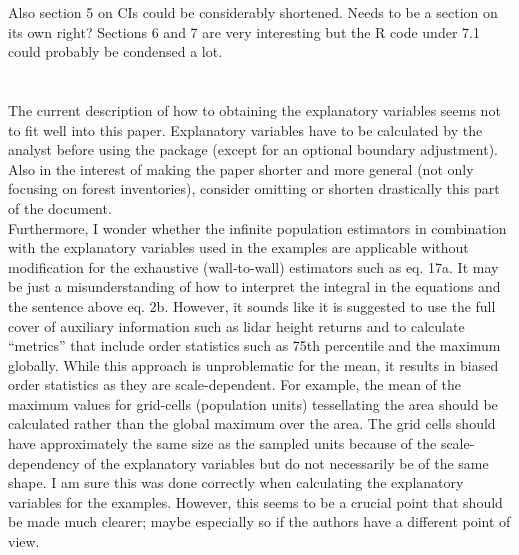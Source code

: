 \documentclass{article}
\begin{document}
Also section 5 on CIs could be considerably shortened. Needs to be a section on its own right? Sections 6 and 7 are very interesting but the R code under 7.1 could probably be condensed a lot.\\
\\
 \\

The current description of how to obtaining the explanatory variables seems not to fit well into this paper. Explanatory variables have to be calculated by the analyst before using the package (except for an optional boundary adjustment). Also in the interest of making the paper shorter and more general (not only focusing on forest inventories), consider omitting or shorten drastically this part of the document.\\

Furthermore, I wonder whether the infinite population estimators in combination with the explanatory variables used in the examples are applicable without modification for the exhaustive (wall-to-wall) estimators such as eq. 17a. It may be just a misunderstanding of how to interpret the integral in the equations and the sentence above eq. 2b. However, it sounds like it is suggested to use the full cover of auxiliary information such as lidar height returns and to calculate “metrics” that include order statistics such as 75th percentile and the maximum globally. While this approach is unproblematic for the mean, it results in biased order statistics as they are scale-dependent. For example, the mean of the maximum values for grid-cells (population units) tessellating the area should be calculated rather than the global maximum over the area. The grid cells should have approximately the same size as the sampled units because of the scale-dependency of the explanatory variables but do not necessarily be of the same shape. I am sure this was done correctly when calculating the explanatory variables for the examples. However, this seems to be a crucial point that should be made much clearer; maybe especially so if the authors have a different point of view.\\

 \\
\end{document}
